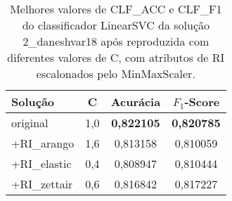 \begin{table}[!thb]
    \centering
    \caption{Melhores valores de CLF\_ACC e CLF\_F1 do classificador LinearSVC da solução 2\_daneshvar18 após reproduzida com diferentes valores de C, com atributos de RI escalonados pelo MinMaxScaler.}
    \begin{adjustbox}{max width={\textwidth},keepaspectratio}%
    \begin{tabular}{|l|c|c|c|}
        \hline
        \textbf{Solução}
        & \textbf{C}
        & \textbf{Acurácia}
        & \textbf{$F_1$-Score}
        \\ \hline
        original        
        & 1,0   & \textbf{0,822105}   & \textbf{0,820785}
        \\ \hline
        +RI\_arango
        & 1,6   & 0,813158   & 0,810059          
        \\ \hline
        +RI\_elastic
        & 0,4   & 0,808947    & 0,810444
        \\ \hline
        +RI\_zettair
        & 0,6   & 0,816842	    & 0,817227
        \\ 
        \hline
    \end{tabular}
    \end{adjustbox}
    \label{tab:reprodução-2-daneshvar18-c} 
\end{table}
